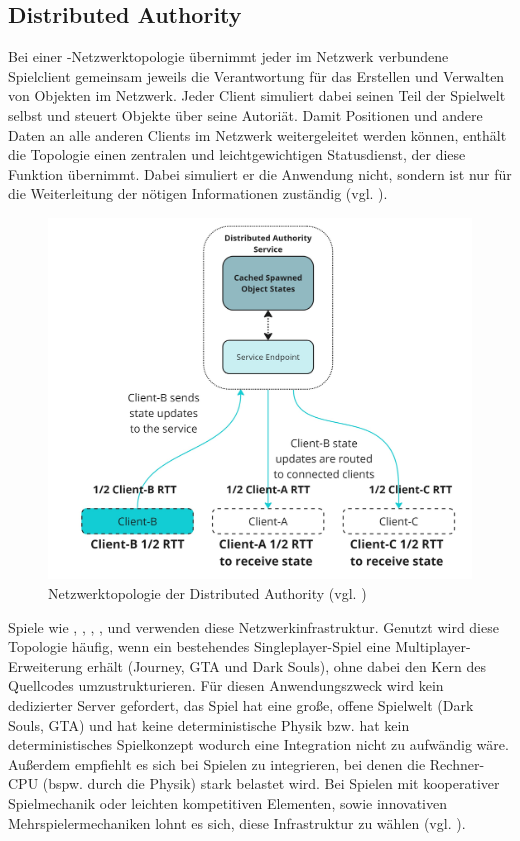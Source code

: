 \subsection{Distributed Authority}
Bei einer -Netzwerktopologie übernimmt jeder im Netzwerk verbundene Spielclient gemeinsam jeweils die Verantwortung für das Erstellen und Verwalten von Objekten im Netzwerk. Jeder Client simuliert dabei seinen Teil der Spielwelt selbst und steuert Objekte über seine Autoriät.
Damit Positionen und andere Daten an alle anderen Clients im Netzwerk weitergeleitet werden können, enthält die Topologie einen zentralen und leichtgewichtigen Statusdienst, der diese Funktion übernimmt. Dabei simuliert er die Anwendung nicht, sondern ist nur für die Weiterleitung der nötigen Informationen zuständig (vgl. \cite{noauthor_distributed_2025}).

\begin{figure}[ht]
\centering
\includegraphics[width=1\linewidth]{content/pictures/distributed-authority-service.jpg}
\caption{Netzwerktopologie der Distributed Authority (vgl. \cite{noauthor_distributed_2025})}
\label{fig:distributed_authority_topology}
\end{figure}

Spiele wie , , , ,  und  verwenden diese Netzwerkinfrastruktur. Genutzt wird diese Topologie häufig, wenn ein bestehendes Singleplayer-Spiel eine Multiplayer-Erweiterung erhält (Journey, GTA und Dark Souls), ohne dabei den Kern des Quellcodes umzustrukturieren. Für diesen Anwendungszweck wird kein dedizierter Server gefordert, das Spiel hat eine große, offene Spielwelt (Dark Souls, GTA) und hat keine deterministische Physik bzw. hat kein deterministisches Spielkonzept wodurch eine Integration nicht zu aufwändig wäre. Außerdem empfiehlt es sich bei Spielen zu integrieren, bei denen die Rechner-CPU (bspw. durch die Physik) stark belastet wird. Bei Spielen mit kooperativer Spielmechanik oder leichten kompetitiven Elementen, sowie innovativen Mehrspielermechaniken lohnt es sich, diese Infrastruktur zu wählen (vgl. \cite{noauthor_choosing_2024}).

